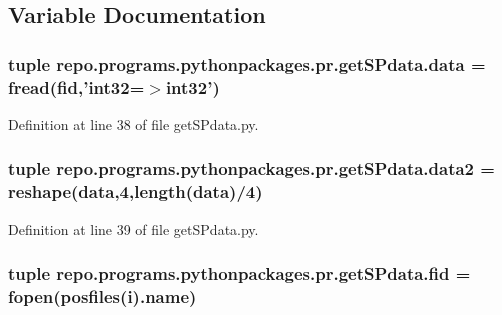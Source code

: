 \subsection{Variable Documentation}
\hypertarget{namespacerepo_1_1programs_1_1pythonpackages_1_1pr_1_1getSPdata_afcc30f10d3721c1b098ac36014f598ba}{
\subsubsection[{data}]{\setlength{\rightskip}{0pt plus 5cm}tuple repo.\-programs.\-pythonpackages.\-pr.\-get\-S\-Pdata.\-data = fread({\bf fid},'int32=$>$int32')}}\label{namespacerepo_1_1programs_1_1pythonpackages_1_1pr_1_1getSPdata_afcc30f10d3721c1b098ac36014f598ba}


Definition at line 38 of file get\-S\-Pdata.\-py.

\hypertarget{namespacerepo_1_1programs_1_1pythonpackages_1_1pr_1_1getSPdata_aadc073490775819f8e7b4eecba84d8c0}{
\subsubsection[{data2}]{\setlength{\rightskip}{0pt plus 5cm}tuple repo.\-programs.\-pythonpackages.\-pr.\-get\-S\-Pdata.\-data2 = reshape({\bf data},4,length({\bf data})/4)}}\label{namespacerepo_1_1programs_1_1pythonpackages_1_1pr_1_1getSPdata_aadc073490775819f8e7b4eecba84d8c0}


Definition at line 39 of file get\-S\-Pdata.\-py.

\hypertarget{namespacerepo_1_1programs_1_1pythonpackages_1_1pr_1_1getSPdata_a0a88573676ca77c114f061278e10a9e5}{
\subsubsection[{fid}]{\setlength{\rightskip}{0pt plus 5cm}tuple repo.\-programs.\-pythonpackages.\-pr.\-get\-S\-Pdata.\-fid = fopen({\bf posfiles}(i).name)}}\label{namespacerepo_1_1programs_1_1pythonpackages_1_1pr_1_1getSPdata_a0a88573676ca77c114f061278e10a9e5}


